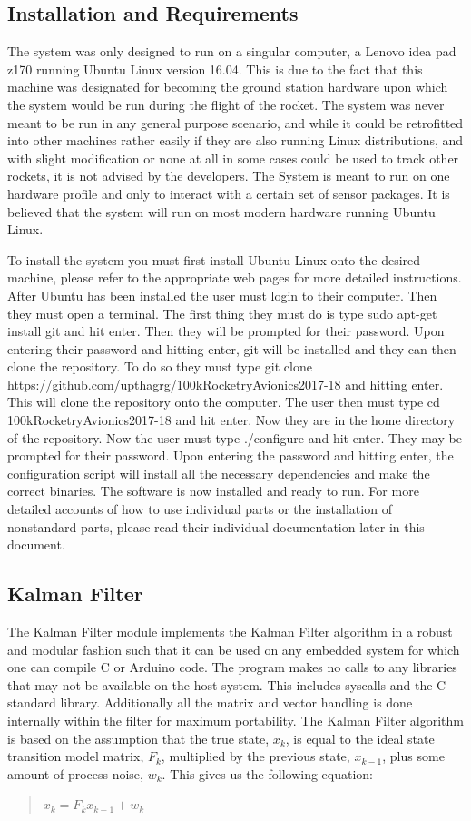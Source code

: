 \documentclass[onecolumn, draftclsnofoot,10pt, compsoc]{IEEEtran}
\begin{document}
\subsection{Installation and Requirements}
The system was only designed to run on a singular computer, a Lenovo idea pad z170 running Ubuntu Linux version 16.04. This is due to the fact that this machine was designated for becoming the ground station hardware upon which the system would be run during the flight of the rocket. The system was never meant to be run in any general purpose scenario, and while it could be retrofitted into other machines rather easily if they are also running Linux distributions, and with slight modification or none at all in some cases could be used to track other rockets, it is not advised by the developers. The System is meant to run on one hardware profile and only to interact with a certain set of sensor packages. It is believed that the system will run on most modern hardware running Ubuntu Linux.\par
To install the system you must first install Ubuntu Linux onto the desired machine, please refer to the appropriate web pages for more detailed instructions. After Ubuntu has been installed the user must login to their computer. Then they must open a terminal. The first thing they must do is type sudo apt-get install git and hit enter. Then they will be prompted for their password. Upon entering their password and hitting enter,  git will be installed and they can then clone the repository. To do so they must type git clone https://github.com/upthagrg/100kRocketryAvionics2017-18 and hitting enter. This will clone the repository onto the computer. The user then must type cd 100kRocketryAvionics2017-18 and hit enter. Now they are in the home directory of the repository. Now the user must type ./configure and hit enter. They may be prompted for their password. Upon entering the password and hitting enter, the configuration script will install all the necessary dependencies and make the correct binaries. The software is now installed and ready to run. For more detailed accounts of how to use individual parts or the installation of nonstandard parts, please read their individual documentation later in this document.
\subsection {Kalman Filter}
The Kalman Filter module implements the Kalman Filter algorithm in a robust and modular fashion such that it can be used on any embedded system for which one can compile C or Arduino code.
The program makes no calls to any libraries that may not be available on the host system.
This includes syscalls and the C standard library.
Additionally all the matrix and vector handling is done internally within the filter for maximum portability.
The Kalman Filter algorithm is based on the assumption that the true state, $x_k$, is equal to the ideal state transition model matrix, $F_k$, multiplied by the previous state, $x_{k-1}$, plus some amount of process noise, $w_k$.
This gives us the following equation:
\begin{quote}
  $x_k = F_kx_{k-1} + w_k$
\end{quote}
\end{document}
